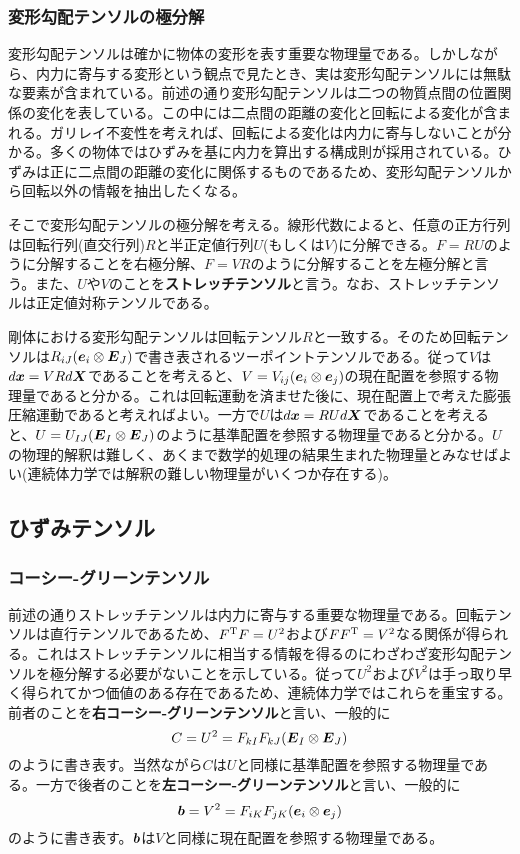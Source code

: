 \documentclass[dvipdfmx, 9pt, a4paper]{jsarticle}
\numberwithin{equation}{section}
\newcommand{\bm}[1]{{\mbox{\boldmath $#1$}}}
\begin{document}
\subsubsection{変形勾配テンソルの極分解}
変形勾配テンソルは確かに物体の変形を表す重要な物理量である。しかしながら、内力に寄与する変形という観点で見たとき、実は変形勾配テンソルには無駄な要素が含まれている。前述の通り変形勾配テンソルは二つの物質点間の位置関係の変化を表している。この中には二点間の距離の変化と回転による変化が含まれる。ガリレイ不変性を考えれば、回転による変化は内力に寄与しないことが分かる。多くの物体ではひずみを基に内力を算出する構成則が採用されている。ひずみは正に二点間の距離の変化に関係するものであるため、変形勾配テンソルから回転以外の情報を抽出したくなる。\par
そこで変形勾配テンソルの極分解を考える。線形代数によると、任意の正方行列は回転行列(直交行列)$R$と半正定値行列$U$(もしくは$V$)に分解できる。$F=RU$のように分解することを右極分解、$F=VR$のように分解することを左極分解と言う。また、$U$や$V$のことを{\bf ストレッチテンソル}と言う。なお、ストレッチテンソルは正定値対称テンソルである。\par
剛体における変形勾配テンソルは回転テンソル$R$と一致する。そのため回転テンソルは$R_{iJ}(\bm e_i\otimes \bm E_J)$で書き表されるツーポイントテンソルである。従って$V$は$d\bm x=VRd\bm X$であることを考えると、$V=V_{ij}(\bm e_i \otimes \bm e_j)$の現在配置を参照する物理量であると分かる。これは回転運動を済ませた後に、現在配置上で考えた膨張圧縮運動であると考えればよい。一方で$U$は$d\bm x=RUd\bm X$であることを考えると、$U=U_{IJ}(\bm E_I \otimes \bm E_J)$のように基準配置を参照する物理量であると分かる。$U$の物理的解釈は難しく、あくまで数学的処理の結果生まれた物理量とみなせばよい(連続体力学では解釈の難しい物理量がいくつか存在する)。

\subsection{ひずみテンソル}
\subsubsection{コーシー-グリーンテンソル}
前述の通りストレッチテンソルは内力に寄与する重要な物理量である。回転テンソルは直行テンソルであるため、$F^{\rm T}F=U^2$および$FF^{\rm T}=V^2$なる関係が得られる。これはストレッチテンソルに相当する情報を得るのにわざわざ変形勾配テンソルを極分解する必要がないことを示している。従って$U^2$および$V^2$は手っ取り早く得られてかつ価値のある存在であるため、連続体力学ではこれらを重宝する。前者のことを{\bf 右コーシー-グリーンテンソル}と言い、一般的に
\begin{equation}
C=U^2=F_{kI}F_{kJ}(\bm E_I \otimes \bm E_J)
\end{equation}
のように書き表す。当然ながら$C$は$U$と同様に基準配置を参照する物理量である。一方で後者のことを{\bf 左コーシー-グリーンテンソル}と言い、一般的に
\begin{equation}
\bm b=V^2=F_{iK}F_{jK}(\bm e_i \otimes \bm e_j)
\end{equation}
のように書き表す。$\bm b$は$V$と同様に現在配置を参照する物理量である。
\end{document}
